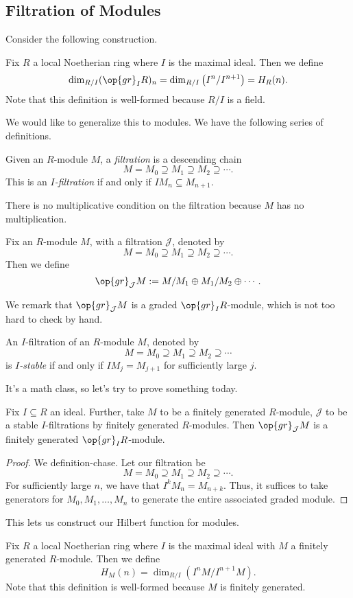 \subsection{Filtration of Modules}
Consider the following construction.
\begin{defi}
	Fix $R$ a local Noetherian ring where $I$ is the maximal ideal. Then we define
	\[\dim_{R/I}(\op{gr}_IR)_n=\dim_{R/I}\left(I^n/I^{n+1}\right)=H_R(n).\]
	Note that this definition is well-formed because $R/I$ is a field.
\end{defi}
We would like to generalize this to modules. We have the following series of definitions.
\begin{definition}
	Given an $R$-module $M$, a \textit{filtration} is a descending chain
	\[M=M_0\supseteq M_1\supseteq M_2\supseteq\cdots.\]
	This is an \textit{$I$-filtration} if and only if $IM_n\subseteq M_{n+1}$.
\end{definition}
There is no multiplicative condition on the filtration because $M$ has no multiplication.
\begin{definition}
	Fix an $R$-module $M$, with a filtration $\mathcal J$, denoted by
	\[M=M_0\supseteq M_1\supseteq M_2\supseteq\cdots.\]
	Then we define
	\[\op{gr}_\mathcal JM:=M/M_1\oplus M_1/M_2\oplus\cdots.\]
\end{definition}
We remark that $\op{gr}_\mathcal JM$ is a graded $\op{gr}_IR$-module, which is not too hard to check by hand.
\begin{definition}[Stable]
	An $I$-filtration of an $R$-module $M$, denoted by
	\[M=M_0\supseteq M_1\supseteq M_2\supseteq\cdots\]
	is \textit{$I$-stable} if and only if $IM_j=M_{j+1}$ for sufficiently large $j$.
\end{definition}
It's a math class, so let's try to prove something today.
\begin{proposition}
	Fix $I\subseteq R$ an ideal. Further, take $M$ to be a finitely generated $R$-module, $\mathcal J$ to be a stable $I$-filtrations by finitely generated $R$-modules. Then $\op{gr}_\mathcal JM$ is a finitely generated $\op{gr}_IR$-module.
\end{proposition}
\begin{proof}
	We definition-chase. Let our filtration be
	\[M=M_0\supseteq M_1\supseteq M_2\supseteq\cdots.\]
	For sufficiently large $n$, we have that $I^kM_n=M_{n+k}$. Thus, it suffices to take generators for $M_0,M_1,\ldots,M_n$ to generate the entire associated graded module.
\end{proof}
This lets us construct our Hilbert function for modules.
\begin{defi}
	Fix $R$ a local Noetherian ring where $I$ is the maximal ideal with $M$ a finitely generated $R$-module. Then we define
	\[H_M(n)=\dim_{R/I}\left(I^nM/I^{n+1}M\right).\]
	Note that this definition is well-formed because $M$ is finitely generated.
\end{defi}

